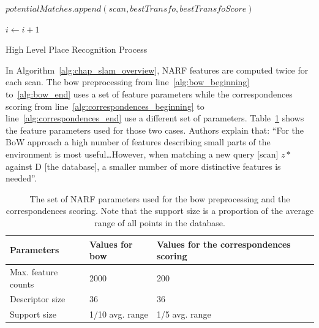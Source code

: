 \begin{algorithm}
\begin{algorithmic}[1]
        \State
        \State $potentialMatches.append(scan, bestTransfo, bestTransfoScore)$
        \EndIf

        \State
        \State $i \gets i+1$
        \EndWhile \label{alg:correspondences_end}

        \State
        \State {}
        \EndFunction
    \end{algorithmic}

    \caption{High Level Place Recognition Process}
    \label{alg:chap_slam_overview}
\end{algorithm}

In Algorithm~\ref{alg:chap_slam_overview}, NARF features are computed twice for each scan. The \gls*{bow} preprocessing from line~\ref{alg:bow_beginning} to~\ref{alg:bow_end} uses a set of feature parameters while the correspondences scoring from line~\ref{alg:correspondences_beginning} to line~\ref{alg:correspondences_end} use a different set of parameters. Table~\ref{tab:chap_slam_narf_parameters} shows the feature parameters used for those two cases. Authors explain that: \enquote{For the BoW approach a high number of features describing small parts of the environment is most useful\dots However, when matching a new query [scan] $z*$ against D [the database], a smaller number of more distinctive features is needed}.

\begin{table}[H]
    \centering
    \begin{tabular}{@{}lll@{}}
        \toprule
        \textbf{Parameters}  & \textbf{Values for \gls*{bow}} & \textbf{Values for the correspondences scoring} \\
        \hline
        Max. feature counts & 2000                          & 200                                \\
        Descriptor size     & 36                            & 36                                 \\
        Support size        & 1/10 avg. range               & 1/5 avg. range                     \\
        \bottomrule
    \end{tabular}
    \caption{The set of NARF parameters used for the \gls*{bow} preprocessing and the correspondences scoring. Note that the support size is a proportion of the average range of all points in the database.}
    \label{tab:chap_slam_narf_parameters}
\end{table}

